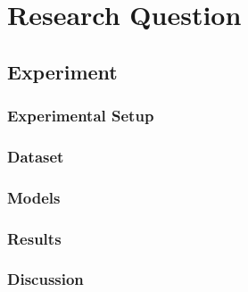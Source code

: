 
\section{Research Question}

\subsection{Experiment}
\subsubsection{Experimental Setup}
\subsubsection{Dataset}
\subsubsection{Models}
\subsubsection{Results}
\subsubsection{Discussion}